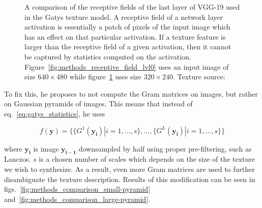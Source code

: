 \begin{figure}[]
\begin{subfigure}[b]{0.48\textwidth}
        \caption{}
        \label{fig:methods_receptive_field_lvl1}
    \end{subfigure}
    \caption{A comparison of the receptive fields of the last layer of VGG-19 used in the Gatys texture model. A receptive field of a network layer activation is essentially a patch of pixels of the input image which has an effect on that particular activation. If a texture feature is larger than the receptive field of a given activation, then it cannot be captured by statistics computed on the activation. Figure~\ref{fig:methods_receptive_field_lvl0} uses an input image of size \(640 \times 480\) while figure~\ref{fig:methods_receptive_field_lvl1} uses size \(320 \times 240\). Texture source: \citet{Pixar128}}
    \label{fig:methods_receptive_field}
\end{figure}

To fix this, he proposes to not compute the Gram matrices on images, but rather on Gaussian pyramids of images. This means that instead of eq.~\ref{eq:gatys_statistics}, he uses

\begin{equation}
    \label{eq:snelgrove_statistics}
    f(\bm{y}) = \{\{G^1(\bm{y_i}) | i = 1, \dots, s\}, \dots, \{G^L(\bm{y_i}) | i = 1, \dots, s\}\}
\end{equation}

where \(\bm{y_i}\) is image \(\bm{y_{i - 1}}\) downsampled by half using proper pre-filtering, such as Lanczos. \(s\) is a chosen number of scales which depends on the size of the texture we wish to synthesize. As a result, even more Gram matrices are used to further disambiguate the texture description. Results of this modification can be seen in figs.~\ref{fig:methods_comparison_small-pyramid} and~\ref{fig:methods_comparison_large-pyramid}.

